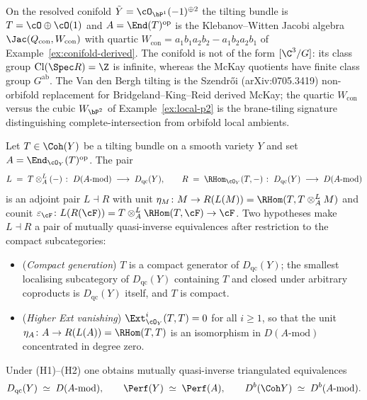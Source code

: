 On the resolved conifold $\tilde Y = \cO_{\bP^1}(-1)^{\oplus 2}$ the tilting bundle is $T = \cO \oplus \cO(1)$ and $A = \End(T)^{\mathrm{op}}$ is the Klebanov--Witten Jacobi algebra $\Jac(Q_{\mathrm{con}}, W_{\mathrm{con}})$ with quartic $W_{\mathrm{con}} = a_1 b_1 a_2 b_2 - a_1 b_2 a_2 b_1$ of Example~\ref{ex:conifold-derived}. The conifold is not of the form $[\C^3/G]$: its class group $\mathrm{Cl}(\Spec R) = \Z$ is infinite, whereas the McKay quotients have finite class group $G^{\mathrm{ab}}$. The Van den Bergh tilting is the Szendr\H{o}i (arXiv:0705.3419) non-orbifold replacement for Bridgeland--King--Reid derived McKay; the quartic $W_{\mathrm{con}}$ versus the cubic $W_{\bP^2}$ of Example~\ref{ex:local-p2} is the brane-tiling signature distinguishing complete-intersection from orbifold local ambients.

\begin{theorem}
\label{thm:derived-morita-adjoint-pair}
Let $T \in \Coh(Y)$ be a tilting bundle on a smooth variety $Y$ and set $A = \End_{\cO_Y}(T)^{\mathrm{op}}$. The pair
\[
 L \;=\; T \otimes^{L}_{A} (-) \;\colon\; D(A\text{-}\mathrm{mod})
 \;\longrightarrow\; D_{\mathrm{qc}}(Y),
 \qquad
 R \;=\; \RHom_{\cO_Y}(T, -) \;\colon\; D_{\mathrm{qc}}(Y)
 \;\longrightarrow\; D(A\text{-}\mathrm{mod})
\]
is an adjoint pair $L \dashv R$ with unit $\eta_M \colon M \to R(L(M)) = \RHom(T, T \otimes^L_A M)$ and counit $\varepsilon_{\cF} \colon L(R(\cF)) = T \otimes^L_A \RHom(T, \cF) \to \cF$. Two hypotheses make $L \dashv R$ a pair of mutually quasi-inverse equivalences after restriction to the compact subcategories:
\begin{itemize}
 \item[(H1)] (\emph{Compact generation}) $T$ is a compact generator of $D_{\mathrm{qc}}(Y)$; the smallest localising subcategory of $D_{\mathrm{qc}}(Y)$ containing $T$ and closed under arbitrary coproducts is $D_{\mathrm{qc}}(Y)$ itself, and $T$ is compact.
 \item[(H2)] (\emph{Higher Ext vanishing}) $\Ext^{i}_{\cO_Y}(T, T) = 0$ for all $i \geq 1$, so that the unit $\eta_A \colon A \to R(L(A)) = \RHom(T, T)$ is an isomorphism in $D(A\text{-}\mathrm{mod})$ concentrated in degree zero.
\end{itemize}
Under (H1)--(H2) one obtains mutually quasi-inverse triangulated equivalences
\[
 D_{\mathrm{qc}}(Y) \;\simeq\; D(A\text{-}\mathrm{mod}),
 \qquad
 \Perf(Y) \;\simeq\; \Perf(A),
 \qquad
 D^{b}(\Coh Y) \;\simeq\; D^{b}(A\text{-}\mathrm{mod}).
\]
\end{theorem}

